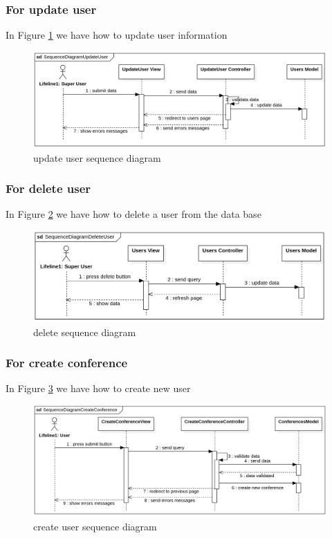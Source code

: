 \documentclass[12pt,a4paper]{article}
\begin{document}
		\subsubsection{For update user}
		In Figure \ref{fig:user-update-s-d} we have how to update user information
		
			\begin{figure}[b]
				\centering
				\includegraphics[width=\textwidth]{diagrams/user_update_sequence.png}
				\caption{update user sequence diagram}
				\label{fig:user-update-s-d}
			\end{figure}
		
		\subsubsection{For delete user}
		In Figure \ref{fig:user-delete-s-d} we have how to delete a user from the data base
		
			\begin{figure}[b]
				\centering
				\includegraphics[width=\textwidth]{diagrams/user_delete_sequence.png}
				\caption{delete sequence diagram}
				\label{fig:user-delete-s-d}
			\end{figure}
		
		\subsubsection{For create conference}
		In Figure \ref{fig:conference-create-s-d} we have how to create new user
		
			\begin{figure}[b]
				\centering
				\includegraphics[width=\textwidth]{diagrams/conference_create_sequence.png}
				\caption{create user sequence diagram}
				\label{fig:conference-create-s-d}
			\end{figure}
		
\end{document}
